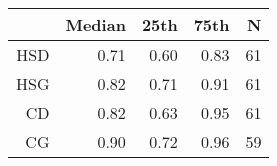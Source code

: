 \begin{tabular}{rrrrr}
\hline
 & Median & 25th & 75th & N \\ 
\hline
HSD & 0.71 & 0.60 & 0.83 & 61 \\ 
HSG & 0.82 & 0.71 & 0.91 & 61 \\ 
CD & 0.82 & 0.63 & 0.95 & 61 \\ 
CG & 0.90 & 0.72 & 0.96 & 59 \\ 
\hline
\end{tabular}%
